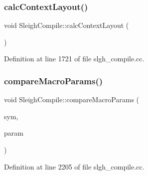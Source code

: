\subsubsection{\texorpdfstring{calcContextLayout()}{calcContextLayout()}}
{\footnotesize\ttfamily void Sleigh\+Compile\+::calc\+Context\+Layout (\begin{DoxyParamCaption}\item[{void}]{ }\end{DoxyParamCaption})}



Definition at line 1721 of file slgh\+\_\+compile.\+cc.

\mbox{\label{class_sleigh_compile_adce2cad9a79bab4e9d03357e96668774}} 
\subsubsection{\texorpdfstring{compareMacroParams()}{compareMacroParams()}}
{\footnotesize\ttfamily void Sleigh\+Compile\+::compare\+Macro\+Params (\begin{DoxyParamCaption}\item[{\mbox{\hyperlink{class_macro_symbol}{Macro\+Symbol}} $\ast$}]{sym,  }\item[{const vector$<$ \mbox{\hyperlink{class_expr_tree}{Expr\+Tree}} $\ast$ $>$ \&}]{param }\end{DoxyParamCaption})}



Definition at line 2205 of file slgh\+\_\+compile.\+cc.

